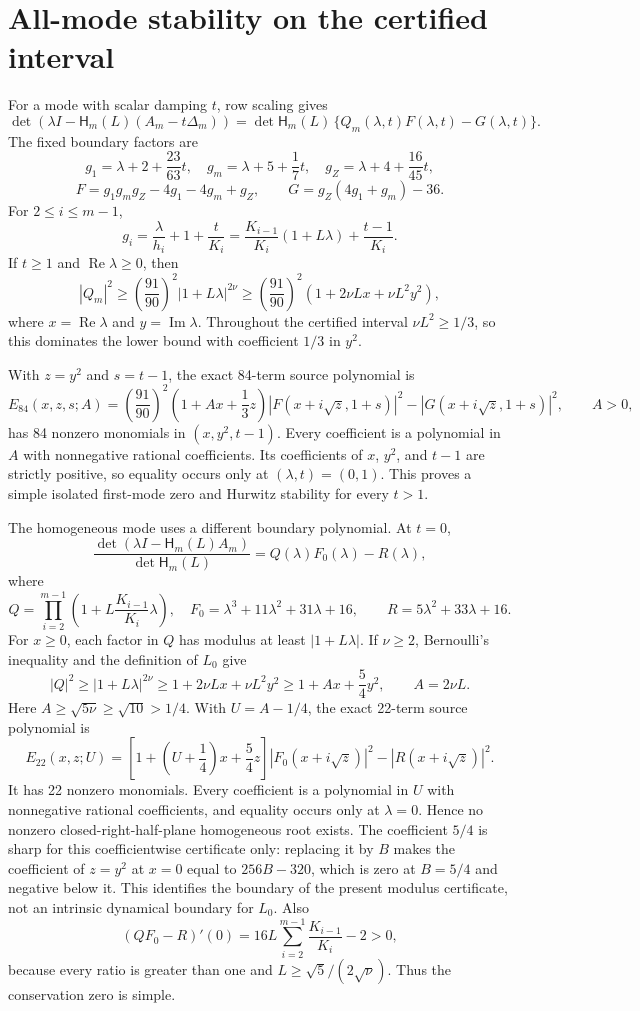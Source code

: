 \section*{All-mode stability on the certified interval}
For a mode with scalar damping $t$, row scaling gives
\[
 \det(\lambda I-\mathsf H_m(L)(A_m-t\Delta_m))
 =\det \mathsf H_m(L)\,\{Q_m(\lambda,t)F(\lambda,t)-G(\lambda,t)\}.
\]
The fixed boundary factors are
\[
 g_1=\lambda+2+\frac{23}{63}t,
 \quad g_m=\lambda+5+\frac17t,
 \quad g_Z=\lambda+4+\frac{16}{45}t,
\]
\[
 F=g_1g_mg_Z-4g_1-4g_m+g_Z,
 \qquad G=g_Z(4g_1+g_m)-36.
\]
For $2\le i\le m-1$,
\[
 g_i=\frac{\lambda}{h_i}+1+\frac{t}{K_i}
 =\frac{K_{i-1}}{K_i}(1+L\lambda)+\frac{t-1}{K_i}.
\]
If $t\ge1$ and $\operatorname{Re}\lambda\ge0$, then
\[
 |Q_m|^2\ge\left(\frac{91}{90}\right)^2|1+L\lambda|^{2\nu}
 \ge\left(\frac{91}{90}\right)^2
 \left(1+2\nu Lx+\nu L^2y^2\right),
\]
where $x=\operatorname{Re}\lambda$ and $y=\operatorname{Im}\lambda$.
Throughout the certified interval $\nu L^2\ge1/3$, so this dominates the
lower bound with coefficient $1/3$ in $y^2$.

With $z=y^2$ and $s=t-1$, the exact 84-term source polynomial is
\[
 E_{84}(x,z,s;A)=\left(\frac{91}{90}\right)^2
 \left(1+A x+\frac13z\right)
 |F(x+i\sqrt z,1+s)|^2-|G(x+i\sqrt z,1+s)|^2,
 \qquad A>0,
\]
has 84 nonzero monomials in $(x,y^2,t-1)$.  Every coefficient is a
polynomial in $A$ with nonnegative rational coefficients.  Its coefficients
of $x$, $y^2$, and $t-1$ are strictly positive, so equality occurs only at
$(\lambda,t)=(0,1)$.  This proves a simple isolated first-mode zero and
Hurwitz stability for every $t>1$.

The homogeneous mode uses a different boundary polynomial.  At $t=0$,
\[
 \frac{\det(\lambda I-\mathsf H_m(L)A_m)}{
 \det\mathsf H_m(L)}=Q(\lambda)F_0(\lambda)-R(\lambda),
\]
where
\[
 Q=\prod_{i=2}^{m-1}
 \left(1+L\frac{K_{i-1}}{K_i}\lambda\right),
 \quad F_0=\lambda^3+11\lambda^2+31\lambda+16,
 \qquad R=5\lambda^2+33\lambda+16.
\]
For $x\ge0$, each factor in $Q$ has modulus at least $|1+L\lambda|$.
If $\nu\ge2$, Bernoulli's inequality and the definition of $L_0$ give
\[
 |Q|^2\ge |1+L\lambda|^{2\nu}
 \ge1+2\nu Lx+\nu L^2y^2
 \ge1+Ax+\frac54y^2,
 \qquad A=2\nu L.
\]
Here $A\ge\sqrt{5\nu}\ge\sqrt{10}>1/4$.
With $U=A-1/4$, the exact 22-term source polynomial is
\[
 E_{22}(x,z;U)=
 \left[1+\left(U+\frac14\right)x+\frac54z\right]
 |F_0(x+i\sqrt z)|^2-|R(x+i\sqrt z)|^2.
\]
It has 22 nonzero monomials.  Every coefficient is a
polynomial in $U$ with nonnegative rational coefficients, and equality occurs
only at $\lambda=0$.  Hence no nonzero closed-right-half-plane homogeneous
root exists.  The coefficient $5/4$ is sharp for this coefficientwise
certificate only: replacing it by $B$ makes the coefficient of $z=y^2$ at
$x=0$ equal to $256B-320$, which is zero at $B=5/4$ and negative below it.
This identifies the boundary of the present modulus certificate, not an
intrinsic dynamical boundary for $L_0$.  Also
\[
 (QF_0-R)'(0)
 =16L\sum_{i=2}^{m-1}\frac{K_{i-1}}{K_i}-2>0,
\]
because every ratio is greater than one and
$L\ge\sqrt5/(2\sqrt\nu)$.  Thus the conservation zero is simple.

